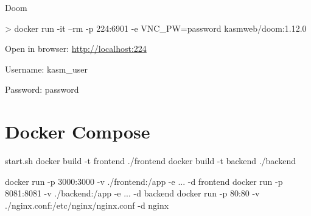 \documentclass{slide}
\begin{document}
\begin{frame}[fragile]{Doom}
    \begin{code}[numbers=none]{}
> docker run -it --rm -p 224:6901 -e VNC_PW=password kasmweb/doom:1.12.0
    \end{code}

Open in browser: \url{http://localhost:224}

Username: kasm\_user

Password: password
\end{frame}



\section{Docker Compose}





\begin{frame}[fragile]
    \begin{code}[language=bash]{start.sh}
docker build -t frontend ./frontend
docker build -t backend ./backend

docker run -p 3000:3000 -v ./frontend:/app -e ... -d frontend
docker run -p 8081:8081 -v ./backend:/app -e ... -d backend
docker run -p 80:80 -v ./nginx.conf:/etc/nginx/nginx.conf -d nginx
    \end{code}
\end{frame}




\end{document}
